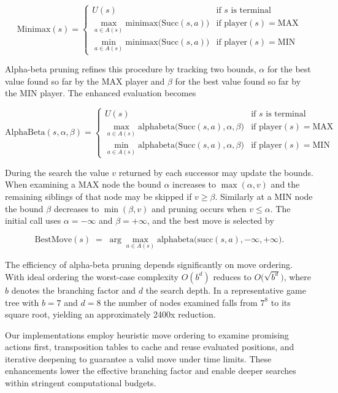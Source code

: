 \documentclass[12pt]{article}
\begin{document}
\[
\mathrm{Minimax}(s) =
\begin{cases}
U(s) & \text{if } s \text{ is terminal}\\
\max_{a\in A(s)} \mathrm{minimax}\bigl(\mathrm{Succ}(s,a)\bigr) & \text{if player}(s)=\mathrm{MAX}\\
\min_{a\in A(s)} \mathrm{minimax}\bigl(\mathrm{Succ}(s,a)\bigr) & \text{if player}(s)=\mathrm{MIN}
\end{cases}
\]

Alpha-beta pruning refines this procedure by tracking two bounds, \(\alpha\) for the best value found so far by the MAX player and \(\beta\) for the best value found so far by the MIN player. The enhanced evaluation becomes

\[
\mathrm{AlphaBeta}(s,\alpha,\beta) =
\begin{cases}
U(s) & \text{if } s \text{ is terminal}\\
\max_{a\in A(s)} \mathrm{alphabeta}\bigl(\mathrm{Succ}(s,a),\alpha,\beta\bigr) & \text{if player}(s)=\mathrm{MAX}\\
\min_{a\in A(s)} \mathrm{alphabeta}\bigl(\mathrm{Succ}(s,a),\alpha,\beta\bigr) & \text{if player}(s)=\mathrm{MIN}
\end{cases}
\]

During the search the value \(v\) returned by each successor may update the bounds. When examining a MAX node the bound \(\alpha\) increases to \(\max(\alpha,v)\) and the remaining siblings of that node may be skipped if \(v\ge\beta\). Similarly at a MIN node the bound \(\beta\) decreases to \(\min(\beta,v)\) and pruning occurs when \(v\le\alpha\). The initial call uses \(\alpha=-\infty\) and \(\beta=+\infty\), and the best move is selected by

\[
\mathrm{BestMove}(s) \;=\;\arg\max_{a\in A(s)}\mathrm{alphabeta}\bigl(\mathrm{succ}(s,a),-\infty,+\infty\bigr).
\]

The efficiency of alpha-beta pruning depends significantly on move ordering. With ideal ordering the worst-case complexity \(O(b^d)\) reduces to \(O\bigl(\sqrt{b^d}\bigr)\), where \(b\) denotes the branching factor and \(d\) the search depth. In a representative game tree with \(b=7\) and \(d=8\) the number of nodes examined falls from \(7^8\) to its square root, yielding an approximately 2400x reduction.

Our implementations employ heuristic move ordering to examine promising actions first, transposition tables to cache and reuse evaluated positions, and iterative deepening to guarantee a valid move under time limits. These enhancements lower the effective branching factor and enable deeper searches within stringent computational budgets.
\end{document}
